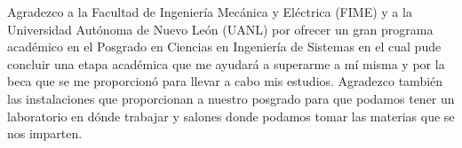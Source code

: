 Agradezco a la Facultad de Ingeniería Mecánica y Eléctrica (FIME) y a la Universidad Autónoma de Nuevo León (UANL) por ofrecer un gran programa a\-ca\-dé\-mi\-co en el Posgrado en Ciencias en Ingeniería de Sistemas en el cual pude concluir una etapa académica que me ayudará a superarme a mí misma y por la beca que se me proporcionó para llevar a cabo mis estudios. Agradezco también las instalaciones que proporcionan a nuestro posgrado para que podamos tener un laboratorio en dónde trabajar y salones donde podamos tomar las materias que se nos imparten.
